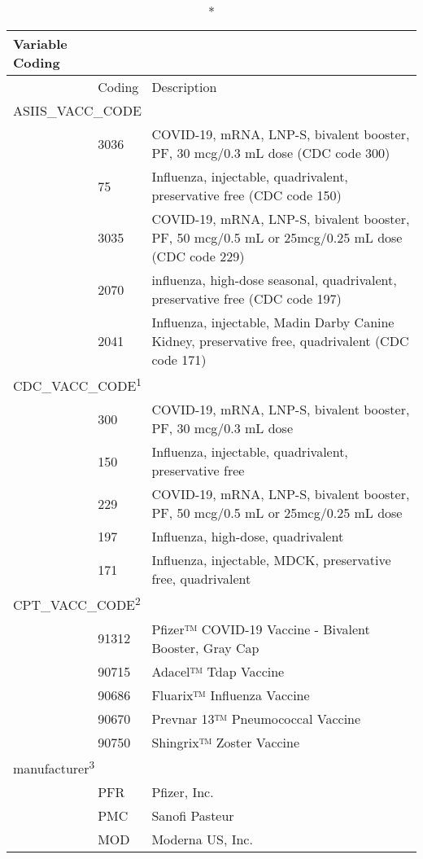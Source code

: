 \documentclass[
  letterpaper,
  DIV=11,
  numbers=noendperiod]{scrreprt}
\begin{document}
\setlength{\LTpost}{0mm}
\begin{longtable}{l|ll}
\caption*{
{\large Variable Coding}
} \\ 
\toprule
\multicolumn{1}{l}{} & Coding & Description \\ 
\midrule
\multicolumn{3}{l}{ASIIS\_VACC\_CODE} \\ 
\midrule
  & 3036 & COVID-19, mRNA, LNP-S, bivalent booster, PF, 30 mcg/0.3 mL dose (CDC code 300) \\ 
  & 75 & Influenza, injectable, quadrivalent, preservative free (CDC code 150) \\ 
  & 3035 & COVID-19, mRNA, LNP-S, bivalent booster, PF, 50 mcg/0.5 mL or 25mcg/0.25 mL dose (CDC code 229) \\ 
  & 2070 & influenza, high-dose seasonal, quadrivalent, preservative free (CDC code 197) \\ 
  & 2041 & Influenza, injectable, Madin Darby Canine Kidney, preservative free, quadrivalent 
                      (CDC code 171) \\ 
\midrule
\multicolumn{3}{l}{CDC\_VACC\_CODE\textsuperscript{1}} \\ 
\midrule
  & 300 & COVID-19, mRNA, LNP-S, bivalent booster, PF, 30 mcg/0.3 mL dose \\ 
  & 150 & Influenza, injectable, quadrivalent, preservative free \\ 
  & 229 & COVID-19, mRNA, LNP-S, bivalent booster, PF, 50 mcg/0.5 mL or 25mcg/0.25 mL dose \\ 
  & 197 & Influenza, high-dose, quadrivalent \\ 
  & 171 & Influenza, injectable, MDCK, preservative free, quadrivalent \\ 
\midrule
\multicolumn{3}{l}{CPT\_VACC\_CODE\textsuperscript{2}} \\ 
\midrule
  & 91312 & Pfizer™ COVID-19 Vaccine - Bivalent Booster, Gray Cap \\ 
  & 90715 & Adacel™ Tdap Vaccine \\ 
  & 90686 & Fluarix™ Influenza Vaccine \\ 
  & 90670 & Prevnar 13™ Pneumococcal Vaccine \\ 
  & 90750 & Shingrix™ Zoster Vaccine \\ 
\midrule
\multicolumn{3}{l}{manufacturer\textsuperscript{3}} \\ 
\midrule
  & PFR & Pfizer, Inc. \\ 
  & PMC & Sanofi Pasteur \\ 
  & MOD & Moderna US, Inc. \\ 

\end{longtable}
\end{document}
